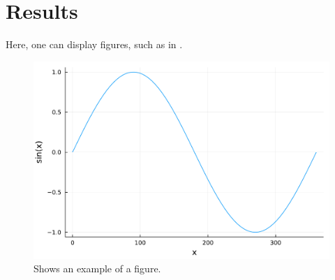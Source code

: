 \section{Results}

Here, one can display figures, such as in .

\begin{figure}
    \centering
    \includegraphics[width=\singlefigure]{figures/example.pdf}
    \caption{\label{fig:example} Shows an example of a figure.}
\end{figure}
